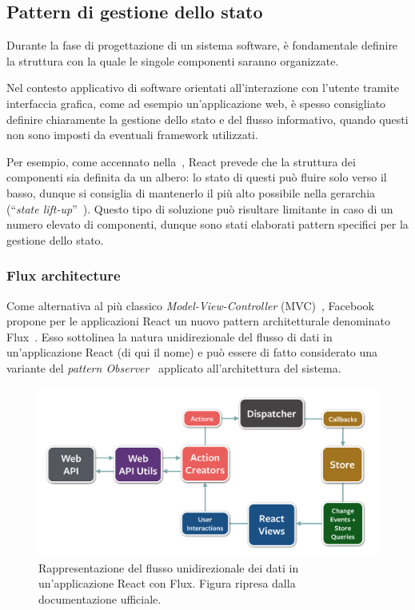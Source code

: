 \subsection{Pattern di gestione dello stato}\label{subsec:state-manage}
Durante la fase di progettazione di un sistema software, è fondamentale definire la struttura con la quale le singole componenti saranno organizzate.

Nel contesto applicativo di software orientati all'interazione con l'utente tramite interfaccia grafica, come ad esempio un'applicazione web,
è spesso consigliato definire chiaramente la gestione dello stato e del flusso informativo, quando questi non sono imposti da eventuali framework utilizzati.

Per esempio, come accennato nella~, React prevede che la struttura dei componenti sia definita da un albero:
lo stato di questi può fluire solo verso il basso, dunque si consiglia di mantenerlo il più alto possibile nella gerarchia (``\emph{state lift-up}''~\cite{react-docs}).
Questo tipo di soluzione può risultare limitante in caso di un numero elevato di componenti, dunque sono stati elaborati pattern specifici per la gestione dello stato.

\subsubsection{Flux architecture}
Come alternativa al più classico \emph{Model-View-Controller} (MVC)~\cite{Reenskaug2003TheM},
Facebook propone per le applicazioni React un nuovo pattern architetturale denominato Flux~\cite{10.1145/2742580.2742818}.
Esso sottolinea la natura unidirezionale del flusso di dati in un'applicazione React (di qui il nome)
e può essere di fatto considerato una variante del \emph{pattern Observer}~\cite{10.5555/186897} applicato all'architettura del sistema.

\begin{figure}[htbp]
  \centering
  \includegraphics[width=.9\textwidth]{res/fig/flux-diagram-white-background.png}
  \caption[
    Rappresentazione del flusso unidirezionale dei dati in un'applicazione React con Flux.
  ]{
    Rappresentazione del flusso unidirezionale dei dati in un'applicazione React con Flux.
    Figura ripresa dalla documentazione ufficiale.
  }%
  \label{fig:flux}
\end{figure}


